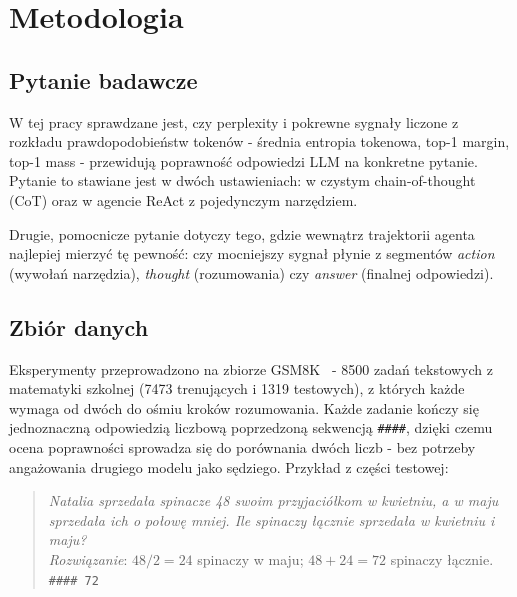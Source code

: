 
\section{Metodologia}
\label{sec:metodologia}

\subsection{Pytanie badawcze}
\label{sec:rq}

W tej pracy sprawdzane jest, czy perplexity i pokrewne sygnały
liczone z rozkładu prawdopodobieństw tokenów - średnia entropia
tokenowa, top-1 margin, top-1 mass - przewidują poprawność
odpowiedzi LLM na konkretne pytanie. Pytanie to stawiane jest
w dwóch ustawieniach: w czystym chain-of-thought (CoT) oraz
w agencie ReAct z pojedynczym narzędziem.

Drugie, pomocnicze pytanie dotyczy tego, gdzie wewnątrz trajektorii
agenta najlepiej mierzyć tę pewność: czy mocniejszy sygnał płynie
z segmentów \emph{action} (wywołań narzędzia), \emph{thought}
(rozumowania) czy \emph{answer} (finalnej odpowiedzi).

\subsection{Zbiór danych}
\label{sec:gsm8k}

Eksperymenty przeprowadzono na zbiorze GSM8K~\cite{cobbe2021gsm8k} -
8500 zadań tekstowych z matematyki szkolnej (7473 trenujących
i 1319 testowych), z których każde wymaga od dwóch do ośmiu kroków
rozumowania. Każde zadanie kończy się jednoznaczną odpowiedzią
liczbową poprzedzoną sekwencją \texttt{\#\#\#\#}, dzięki czemu
ocena poprawności sprowadza się do porównania dwóch liczb - bez
potrzeby angażowania drugiego modelu jako sędziego. Przykład
z części testowej:

\begin{quote}
\textit{Natalia sprzedała spinacze 48 swoim przyjaciółkom w kwietniu,
a w maju sprzedała ich o połowę mniej. Ile spinaczy łącznie
sprzedała w kwietniu i maju?}\\
\textit{Rozwiązanie}: $48/2 = 24$ spinaczy w maju; $48 + 24 = 72$
spinaczy łącznie. \texttt{\#\#\#\# 72}
\end{quote}

